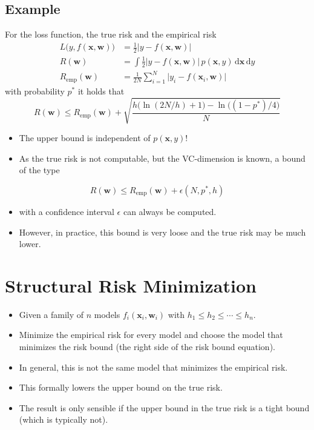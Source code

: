 \documentclass[a4paper, 11pt, accentcolor = tud3b]{tudreport}
\newcommand{\dif}[1]{\ensuremath{\,\mathrm{d}#1}}
\newcommand{\emp}{\textrm{emp}}
\renewcommand{\vec}[1]{\mathbf{#1}}
\begin{document}
			\subsection{Example}
				For the loss function, the true risk and the empirical risk
				\begin{align}
					L\big(y, f(\vec{x}, \vec{w})\big) &= \frac{1}{2} \big\lvert y - f(\vec{x}, \vec{w}) \big\rvert \\
					R(\vec{w}) &= \int \frac{1}{2} \big\lvert y - f(\vec{x}, \vec{w}) \big\rvert \, p(\vec{x}, y) \dif{\vec{x}} \dif{y} \\
					R_\emp(\vec{w}) &= \frac{1}{2N} \sum_{i = 1}^{N} \big\lvert y_i - f(\vec{x}_i, \vec{w}) \big\rvert
				\end{align}
				with probability \( p^\ast \) it holds that
				\begin{equation}
					R(\vec{w}) \leq R_\emp(\vec{w}) + \sqrt{\frac{h\big(\ln(2N / h) + 1\big) - \ln\big((1 - p^\ast) / 4\big)}{N}}
				\end{equation}
				\begin{itemize}
					\item The upper bound is independent of \( p(\vec{x}, y) \)!
					\item As the true risk is not computable, but the VC-dimension is known, a bound of the type
				\end{itemize}
				\begin{equation}
					R(\vec{w}) \leq R_\emp(\vec{w}) + \epsilon(N, p^\ast, h)
				\end{equation}
				\begin{itemize}
					\item[] with a confidence interval \(\epsilon\) can always be computed.
					\item However, in practice, this bound is very loose and the true risk may be much lower.
				\end{itemize}

		\section{Structural Risk Minimization}
			\begin{itemize}
				\item Given a family of \(n\) models \( f_i(\vec{x}_i, \vec{w}_i) \) with \( h_1 \leq h_2 \leq \cdots \leq h_n \).
				\item Minimize the empirical risk for every model and choose the model that minimizes the risk bound (the right side of the risk bound equation).
				\item In general, this is not the same model that minimizes the empirical risk.
				\item This formally lowers the upper bound on the true risk.
				\item The result is only sensible if the upper bound in the true risk is a tight bound (which is typically not).
			\end{itemize}
		
\end{document}
